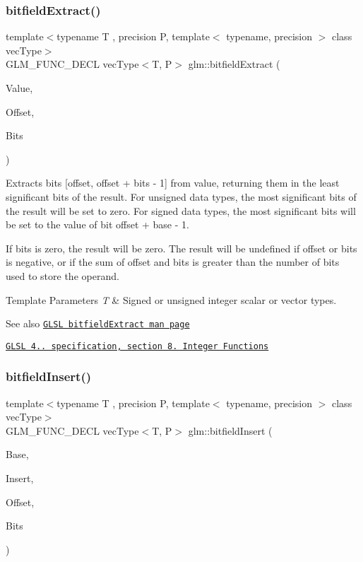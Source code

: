 \subsubsection{\texorpdfstring{bitfield\+Extract()}{bitfieldExtract()}}
{\footnotesize\ttfamily template$<$typename T , precision P, template$<$ typename, precision $>$ class vec\+Type$>$ \\
G\+L\+M\+\_\+\+F\+U\+N\+C\+\_\+\+D\+E\+CL vec\+Type$<$T, P$>$ glm\+::bitfield\+Extract (\begin{DoxyParamCaption}\item[{vec\+Type$<$ T, P $>$ const \&}]{Value,  }\item[{int}]{Offset,  }\item[{int}]{Bits }\end{DoxyParamCaption})}

Extracts bits \mbox{[}offset, offset + bits -\/ 1\mbox{]} from value, returning them in the least significant bits of the result. For unsigned data types, the most significant bits of the result will be set to zero. For signed data types, the most significant bits will be set to the value of bit offset + base -\/ 1.

If bits is zero, the result will be zero. The result will be undefined if offset or bits is negative, or if the sum of offset and bits is greater than the number of bits used to store the operand.


\begin{DoxyTemplParams}{Template Parameters}
{\em T} & Signed or unsigned integer scalar or vector types.\\
\hline
\end{DoxyTemplParams}
\begin{DoxySeeAlso}{See also}
\href{http://www.opengl.org/sdk/docs/manglsl/xhtml/bitfieldExtract.xml}{\tt G\+L\+SL bitfield\+Extract man page} 

\href{http://www.opengl.org/registry/doc/GLSLangSpec.4.20.8.pdf}{\tt G\+L\+SL 4.. specification, section 8. Integer Functions} 
\end{DoxySeeAlso}
\mbox{\label{group__core__func__integer_ga5681dfac9239beb1b8bd995e3c6496d7}} 
\subsubsection{\texorpdfstring{bitfield\+Insert()}{bitfieldInsert()}}
{\footnotesize\ttfamily template$<$typename T , precision P, template$<$ typename, precision $>$ class vec\+Type$>$ \\
G\+L\+M\+\_\+\+F\+U\+N\+C\+\_\+\+D\+E\+CL vec\+Type$<$T, P$>$ glm\+::bitfield\+Insert (\begin{DoxyParamCaption}\item[{vec\+Type$<$ T, P $>$ const \&}]{Base,  }\item[{vec\+Type$<$ T, P $>$ const \&}]{Insert,  }\item[{int}]{Offset,  }\item[{int}]{Bits }\end{DoxyParamCaption})}

